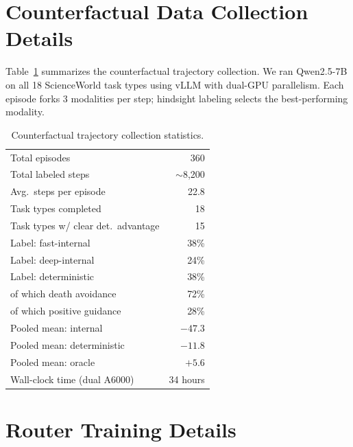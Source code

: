 \documentclass[11pt,a4paper]{article}
\begin{document}
\appendix

\section{Counterfactual Data Collection Details}
\label{app:data}

Table~\ref{tab:data_stats} summarizes the counterfactual trajectory collection.
We ran Qwen2.5-7B on all 18 ScienceWorld task types using vLLM with dual-GPU parallelism.
Each episode forks 3 modalities per step; hindsight labeling selects the best-performing modality.

\begin{table}[h]
\centering
\small
\begin{tabular}{lr}
\toprule
Total episodes & 360 \\
Total labeled steps & $\sim$8,200 \\
Avg.\ steps per episode & 22.8 \\
Task types completed & 18 \\
Task types w/ clear det.\ advantage & 15 \\
\midrule
Label: fast-internal & 38\% \\
Label: deep-internal & 24\% \\
Label: deterministic & 38\% \\
\quad of which death avoidance & 72\% \\
\quad of which positive guidance & 28\% \\
\midrule
Pooled mean: internal & $-47.3$ \\
Pooled mean: deterministic & $-11.8$ \\
Pooled mean: oracle & $+5.6$ \\
\midrule
Wall-clock time (dual A6000) & 34 hours \\
\bottomrule
\end{tabular}
\caption{Counterfactual trajectory collection statistics.}
\label{tab:data_stats}
\end{table}

\section{Router Training Details}
\label{app:router}
\end{document}
